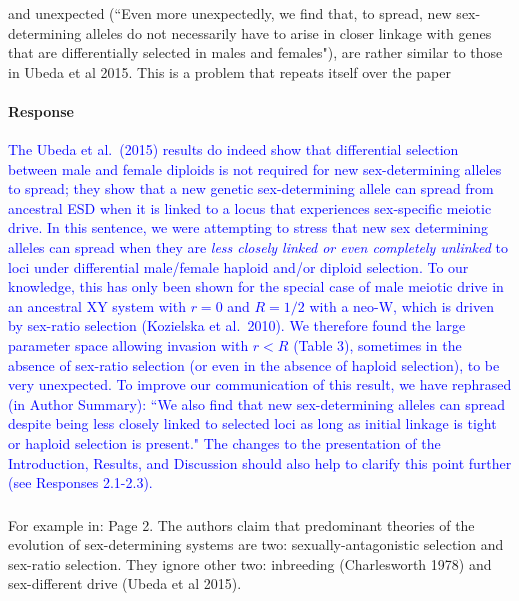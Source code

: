 \documentclass[10pt,letterpaper]{article}
\begin{document}
\noindent\subsubsection{}
\noindent and unexpected (``Even more unexpectedly, we find that, to spread, new sex-determining alleles do not necessarily have to arise in closer linkage with genes that are differentially selected in males and females"), are rather similar to those in Ubeda et al 2015. This is a problem that repeats itself over the paper 

\noindent\paragraph{Response}
\textcolor{blue}{
The Ubeda et al.\ (2015) results do indeed show that differential selection between male and female diploids is not required for new sex-determining alleles to spread; they show that a new genetic sex-determining allele can spread from ancestral ESD when it is linked to a locus that experiences sex-specific meiotic drive. 
In this sentence, we were attempting to stress that new sex determining alleles can spread when they are \textit{less closely linked or even completely unlinked} to loci under differential male/female haploid and/or diploid selection. 
To our knowledge, this has only been shown for the special case of male meiotic drive in an ancestral XY system with $r=0$ and $R=1/2$ with a neo-W, which is driven by sex-ratio selection (Kozielska et al.\ 2010). 
We therefore found the large parameter space allowing invasion with $r<R$ (Table 3), sometimes in the absence of sex-ratio selection (or even in the absence of haploid selection), to be very unexpected.
To improve our communication of this result, we have rephrased (in Author Summary): ``We also find that new sex-determining alleles can spread despite being less closely linked to selected loci as long as initial linkage is tight or haploid selection is present." 
The changes to the presentation of the Introduction, Results, and Discussion should also help to clarify this point further (see Responses 2.1-2.3). 
}

\noindent\subsubsection{}
For example in: Page 2. The authors claim that predominant theories of the evolution of sex-determining systems are two: sexually-antagonistic selection and sex-ratio selection. They ignore other two: inbreeding (Charlesworth 1978) and sex-different drive (Ubeda et al 2015). 
\end{document}
